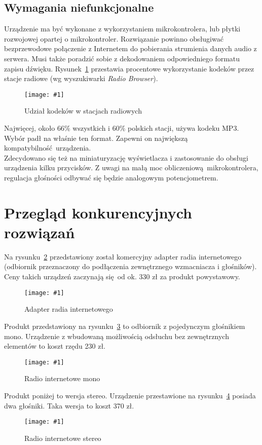 \documentclass[polish]{aghengthesis}
\newcommand{\imgint}[4]{
	\begin{figure}[{#4}]
		\centering
		\texttt{[image: \#1]}
		\caption{#2}
		\label{#1}
	\end{figure}
}
\newcommand{\imgh}[3]{\imgint{#1}{#2}{#3}{H}}
\begin{document}
		\subsection{Wymagania niefunkcjonalne}
			Urządzenie ma być wykonane z wykorzystaniem mikrokontrolera, lub płytki rozwojowej opartej o mikrokontroler. Rozwiązanie powinno obsługiwać bezprzewodowe połączenie z Internetem do pobierania strumienia danych audio z serwera.
			Musi także poradzić sobie z dekodowaniem odpowiedniego formatu zapisu dźwięku.
			Rysunek~\ref{3/rb_chart_new} przestawia procentowe wykorzystanie kodeków przez stacje radiowe (wg wyszukiwarki \textit{Radio Browser}\textsuperscript{\cite{radio_browser_codecs}}).
			
			\imgh{3/rb_chart_new}{Udział kodeków w stacjach radiowych}{0.9}
			
			Najwięcej, około 66\% wszystkich i 60\% polskich stacji, używa kodeku MP3. Wybór padł na właśnie ten format. Zapewni on największą kompatybilność urządzenia.
			$ $\\
			
			Zdecydowano się też na miniaturyzację wyświetlacza i zastosowanie do obsługi urządzenia kilku przycisków. Z uwagi na małą moc obliczeniową mikrokontrolera, regulacja głośności odbywać się będzie analogowym potencjometrem.
		
	\section{Przegląd konkurencyjnych rozwiązań}
		Na rysunku~\ref{1/radio_adapter} przedstawiony został komercyjny adapter radia internetowego (odbiornik przeznaczony do podłączenia zewnętrznego wzmacniacza i głośników). Ceny takich urządzeń zaczynają się od ok. 330 zł za produkt powystawowy. 
		\imgh{1/radio_adapter}{Adapter radia internetowego \textsuperscript{\cite{radio_adapter}}}{0.7}
		
		Produkt przedstawiony na rysunku~\ref{1/radio_tanie} to odbiornik z pojedynczym głośnikiem mono. Urządzenie z wbudowaną możliwością odsłuchu bez zewnętrznych elementów to koszt rzędu 230 zł.
		\imgh{1/radio_tanie}{Radio internetowe mono \textsuperscript{\cite{radio_tanie}}}{0.4}
		
		Produkt poniżej to wersja stereo. Urządzenie przestawione na rysunku~\ref{1/radio_drogie} posiada dwa głośniki. Taka wersja to koszt	370 zł.
		
		\imgh{1/radio_drogie}{Radio internetowe stereo \textsuperscript{\cite{radio_drogie}}}{0.4}
		
\end{document}
